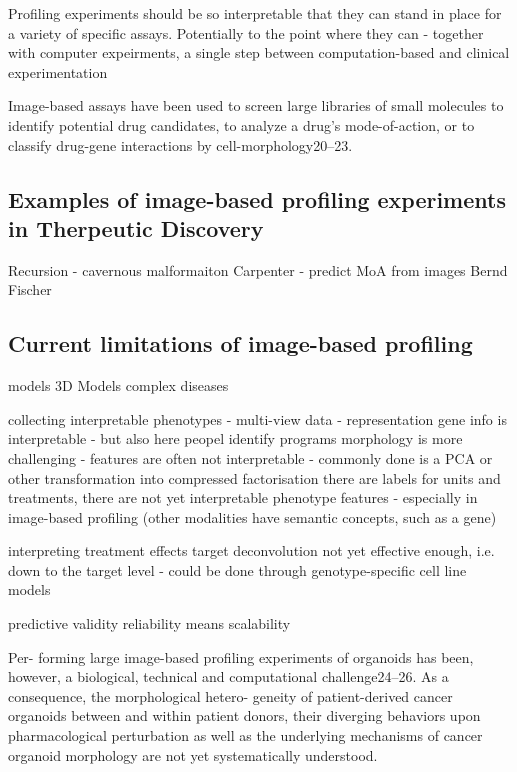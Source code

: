 \begin{flushleft}
Profiling experiments should be so interpretable that they can stand in place for a variety of specific assays. Potentially to the point where they can - together with computer expeirments, a single step between computation-based and clinical experimentation


Image-based assays have been used to screen large libraries of small molecules to identify potential drug candidates, to analyze a drug’s mode-of-action, or to classify drug-gene interactions by cell-morphology20–23. 

\subsection{Examples of image-based profiling experiments in Therpeutic Discovery}

Recursion - cavernous malformaiton
Carpenter - predict MoA from images
Bernd Fischer



\subsection{Current limitations of image-based profiling}

models 3D Models
complex diseases 

collecting interpretable phenotypes - multi-view data - representation
gene info is interpretable - but also here peopel identify programs
morphology is more challenging - features are often not interpretable - commonly done is a PCA or other transformation into compressed
factorisation
there are labels for units and treatments, there are not yet interpretable phenotype features - especially in image-based profiling (other modalities have semantic concepts, such as a gene)


interpreting treatment effects
target deconvolution not yet effective enough, i.e. down to the target level - could be done through genotype-specific cell line models



predictive validity
reliability means scalability




Per- forming large image-based profiling experiments of organoids has been, however, a biological, technical and computational challenge24–26. As a consequence, the morphological hetero- geneity of patient-derived cancer organoids between and within patient donors, their diverging behaviors upon pharmacological perturbation as well as the underlying mechanisms of cancer organoid morphology are not yet systematically understood.



\end{flushleft}
